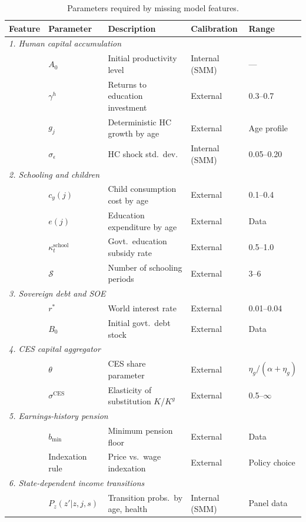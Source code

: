 \begin{table}[H]
\centering
\small
\caption{Parameters required by missing model features.}
\label{tab:future-params}
\begin{tabular}{lllll}
\toprule
Feature & Parameter & Description & Calibration & Range \\
\midrule
\multicolumn{5}{l}{\textit{1. Human capital accumulation}} \\
& $A_0$ & Initial productivity level & Internal (SMM) & --- \\
& $\gamma^h$ & Returns to education investment & External & 0.3--0.7 \\
& $g_j$ & Deterministic HC growth by age & External & Age profile \\
& $\sigma_\epsilon$ & HC shock std.\ dev. & Internal (SMM) & 0.05--0.20 \\
\midrule
\multicolumn{5}{l}{\textit{2. Schooling and children}} \\
& $c_y(j)$ & Child consumption cost by age & External & 0.1--0.4 \\
& $e(j)$ & Education expenditure by age & External & Data \\
& $\kappa^{\text{school}}_t$ & Govt.\ education subsidy rate & External & 0.5--1.0 \\
& $\mathcal{S}$ & Number of schooling periods & External & 3--6 \\
\midrule
\multicolumn{5}{l}{\textit{3. Sovereign debt and SOE}} \\
& $r^*$ & World interest rate & External & 0.01--0.04 \\
& $B_0$ & Initial govt.\ debt stock & External & Data \\
\midrule
\multicolumn{5}{l}{\textit{4. CES capital aggregator}} \\
& $\theta$ & CES share parameter & External & $\eta_g/(\alpha+\eta_g)$ \\
& $\sigma^{\text{CES}}$ & Elasticity of substitution $K$/$K^g$ & External & 0.5--$\infty$ \\
\midrule
\multicolumn{5}{l}{\textit{5. Earnings-history pension}} \\
& $b_{\min}$ & Minimum pension floor & External & Data \\
& Indexation rule & Price vs.\ wage indexation & External & Policy choice \\
\midrule
\multicolumn{5}{l}{\textit{6. State-dependent income transitions}} \\
& $P_z(z'|z,j,s)$ & Transition probs.\ by age, health & Internal (SMM) & Panel data \\
\bottomrule
\end{tabular}
\end{table}

